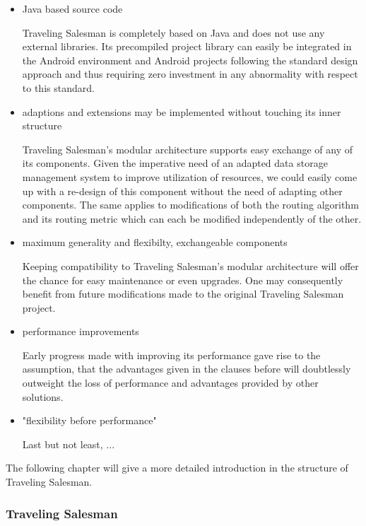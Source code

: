 \begin{itemize}
	\item Java based source code
	
		Traveling Salesman is completely based on Java and does not use any external libraries. Its precompiled project library can easily be integrated in the Android environment and Android projects following the standard design approach and thus requiring zero investment in any abnormality with respect to this standard.
	
	\item adaptions and extensions may be implemented without touching its inner structure
	
		Traveling Salesman's modular architecture supports easy exchange of any of its components. Given the imperative need of an adapted data storage management system to improve utilization of resources, we could easily come up with a re-design of this component without the need of adapting other components. The same applies to modifications of both the routing algorithm and its routing metric which can each be modified independently of the other.
	
	\item maximum generality and flexibilty, exchangeable components
	
		Keeping compatibility to Traveling Salesman's modular architecture will offer the chance for easy maintenance or even upgrades. One may consequently benefit from future modifications made to the original Traveling Salesman project.
	
	\item performance improvements
	
		Early progress made with improving its performance gave rise to the assumption, that the advantages given in the clauses before will doubtlessly outweight the loss of performance and advantages provided by other solutions.
		
	\item "flexibility before performance"
	
		Last but not least, ...
	
\end{itemize}


The following chapter will give a more detailed introduction in the structure of Traveling Salesman.

\subsubsection{Traveling Salesman}

